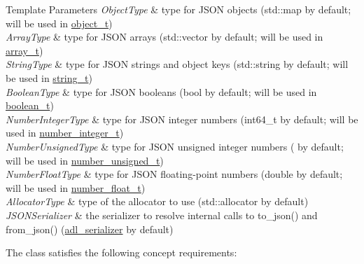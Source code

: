 \begin{DoxyTemplParams}{Template Parameters}
{\em Object\+Type} & type for J\+S\+ON objects ({\ttfamily std\+::map} by default; will be used in \mbox{\hyperlink{classnlohmann_1_1basic__json_a5e48a7893520e1314bf0c9723e26ea2a}{object\+\_\+t}}) \\
\hline
{\em Array\+Type} & type for J\+S\+ON arrays ({\ttfamily std\+::vector} by default; will be used in \mbox{\hyperlink{classnlohmann_1_1basic__json_ae095578e03df97c5b3991787f1056374}{array\+\_\+t}}) \\
\hline
{\em String\+Type} & type for J\+S\+ON strings and object keys ({\ttfamily std\+::string} by default; will be used in \mbox{\hyperlink{classnlohmann_1_1basic__json_a61f8566a1a85a424c7266fb531dca005}{string\+\_\+t}}) \\
\hline
{\em Boolean\+Type} & type for J\+S\+ON booleans ({\ttfamily bool} by default; will be used in \mbox{\hyperlink{classnlohmann_1_1basic__json_a4c919102a9b4fe0d588af64801436082}{boolean\+\_\+t}}) \\
\hline
{\em Number\+Integer\+Type} & type for J\+S\+ON integer numbers ({\ttfamily int64\+\_\+t} by default; will be used in \mbox{\hyperlink{classnlohmann_1_1basic__json_a98e611d67b7bd75307de99c9358ab2dc}{number\+\_\+integer\+\_\+t}}) \\
\hline
{\em Number\+Unsigned\+Type} & type for J\+S\+ON unsigned integer numbers ({} by default; will be used in \mbox{\hyperlink{classnlohmann_1_1basic__json_ab906e29b5d83ac162e823ada2156b989}{number\+\_\+unsigned\+\_\+t}}) \\
\hline
{\em Number\+Float\+Type} & type for J\+S\+ON floating-\/point numbers ({\ttfamily double} by default; will be used in \mbox{\hyperlink{classnlohmann_1_1basic__json_a88d6103cb3620410b35200ee8e313d97}{number\+\_\+float\+\_\+t}}) \\
\hline
{\em Allocator\+Type} & type of the allocator to use ({\ttfamily std\+::allocator} by default) \\
\hline
{\em J\+S\+O\+N\+Serializer} & the serializer to resolve internal calls to {\ttfamily to\+\_\+json()} and {\ttfamily from\+\_\+json()} (\mbox{\hyperlink{structnlohmann_1_1adl__serializer}{adl\+\_\+serializer}} by default)\\
\hline
\end{DoxyTemplParams}
The class satisfies the following concept requirements\+:
